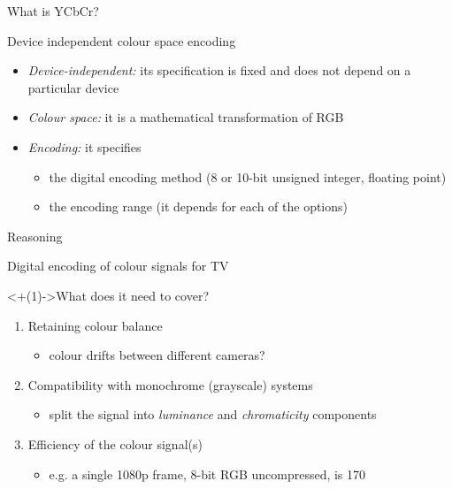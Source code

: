 \documentclass[final, aspectratio=169]{divoc}
\begin{document}
\begin{frame}{What is YCbCr?}
  \begin{center}
    Device independent colour space encoding
  \end{center}

  \begin{itemize}[<+(1)->]
    \item \emph{Device-independent:} its specification is fixed and does not depend on a particular device
    \item \emph{Colour space:} it is a mathematical transformation of RGB
    \item \emph{Encoding:} it specifies
          \begin{itemize}
            \item the digital encoding method (8 or 10-bit unsigned integer, floating point)
            \item the encoding range (it depends for each of the options)
          \end{itemize}
  \end{itemize}
\end{frame}
\begin{frame}{Reasoning}
  \begin{center}
    Digital encoding of colour signals for TV
  \end{center}

  \uncover<+(1)->{What does it need to cover? \autocite{tooms}}
  \begin{enumerate}[<+(1)->]
    \item Retaining colour balance
          \begin{itemize}
            \item colour drifts between different cameras? 
          \end{itemize}
    \item Compatibility with monochrome (grayscale) systems
          \begin{itemize}
            \item split the signal into \emph{luminance} and \emph{chromaticity} components
          \end{itemize}
    \item Efficiency of the colour signal(s)
          \begin{itemize}
            \item e.g. a single 1080p frame, 8-bit RGB uncompressed, is \SI{170}{\mega\byte}
          \end{itemize}
  \end{enumerate}
\end{frame}
\end{document}
